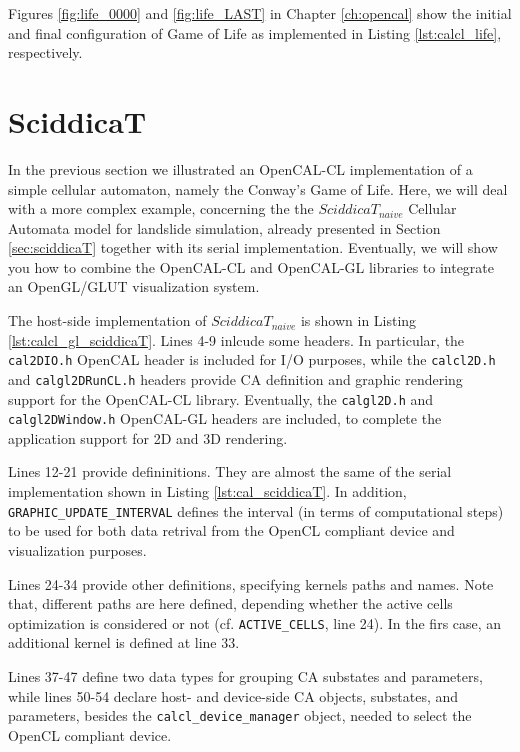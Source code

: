 Figures \ref{fig:life_0000} and \ref{fig:life_LAST} in Chapter
\ref{ch:opencal} show the initial and final configuration of Game of
Life as implemented in Listing \ref{lst:calcl_life}, respectively.


\section{SciddicaT}\label{sec:calcl_sciddicaT}
In the previous section we illustrated an OpenCAL-CL implementation of
a simple cellular automaton, namely the Conway’s Game of Life. Here,
we will deal with a more complex example, concerning the the
$SciddicaT_{naive}$ Cellular Automata model for landslide simulation,
already presented in Section \ref{sec:sciddicaT} together with its
serial implementation. Eventually, we will show you how to combine the
OpenCAL-CL and OpenCAL-GL libraries to integrate an OpenGL/GLUT
visualization system.



The host-side implementation of $SciddicaT_{naive}$ is shown in
Listing \ref{lst:calcl_gl_sciddicaT}. Lines 4-9 inlcude some
headers. In particular, the \verb'cal2DIO.h' OpenCAL header is
included for I/O purposes, while the \verb'calcl2D.h' and
\verb'calgl2DRunCL.h' headers provide CA definition and graphic
rendering support for the OpenCAL-CL library. Eventually, the
\verb'calgl2D.h' and \verb'calgl2DWindow.h' OpenCAL-GL headers are
included, to complete the application support for 2D and 3D rendering.

Lines 12-21 provide defininitions. They are almost the same of the
serial implementation shown in Listing \ref{lst:cal_sciddicaT}. In
addition, \verb'GRAPHIC_UPDATE_INTERVAL' defines the interval (in
terms of computational steps) to be used for both data retrival from
the OpenCL compliant device and visualization purposes.

Lines 24-34 provide other definitions, specifying kernels paths and
names. Note that, different paths are here defined, depending whether
the active cells optimization is considered or not
(cf. \verb'ACTIVE_CELLS', line 24). In the firs case, an additional
kernel is defined at line 33.

Lines 37-47 define two data types for grouping CA substates and
parameters, while lines 50-54 declare host- and device-side CA
objects, substates, and parameters, besides the
\verb'calcl_device_manager' object, needed to select the OpenCL
compliant device.

